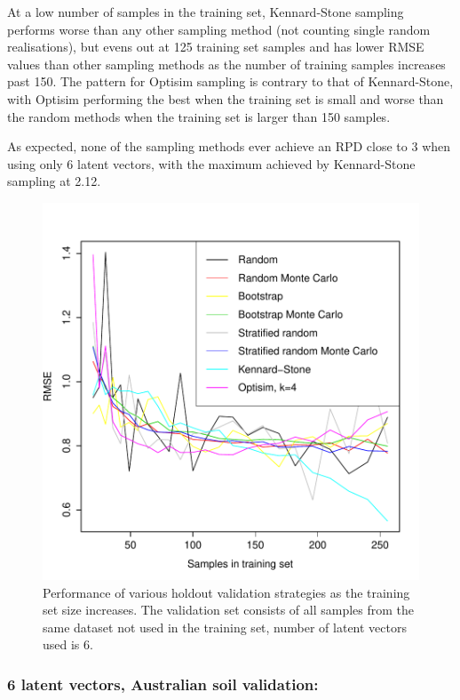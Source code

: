 \documentclass{isprs}
\begin{document}
At a low number of samples in the training set, Kennard-Stone sampling performs worse than any other sampling method (not counting single random realisations), but evens out at 125 training set samples and has lower RMSE values than other sampling methods as the number of training samples increases past 150. The pattern for Optisim sampling is contrary to that of Kennard-Stone, with Optisim performing the best when the training set is small and worse than the random methods when the training set is larger than 150 samples.

As expected, none of the sampling methods ever achieve an RPD close to 3 when using only 6 latent vectors, with the maximum achieved by Kennard-Stone sampling at 2.12.

\begin{figure}[ht!]
\includegraphics[width=1.0\columnwidth]{../script/output/rmse-nl-6.pdf}
\begin{center}
    \caption{Performance of various holdout validation strategies as the training set size increases. The validation set consists of all samples from the same dataset not used in the training set, number of latent vectors used is 6.}
    \label{fig:rmse-nl-6}
\end{center}
\end{figure}

\subsubsection{6 latent vectors, Australian soil validation:}\label{sec:AU6}
\end{document}
